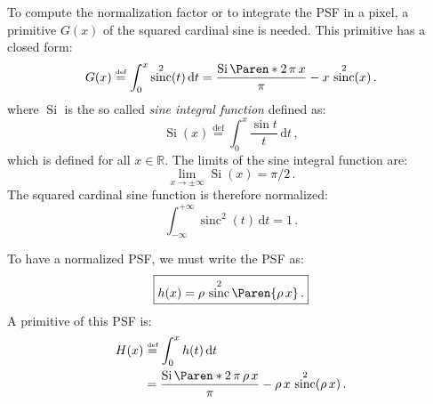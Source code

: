 \documentclass[a4paper,10pt,twocolumn]{scrartcl}
\newcommand*{\mathd}{\mathrm{d}}
\DeclareMathOperator{\sinc}{sinc}
\DeclareMathOperator{\sinint}{Si}
\newcommand*{\Set}[1]{\mathbb{#1}}
\newcommand*{\Reals}{\Set{R}}
\newcommand*{\bydef}{\stackrel{{\scriptscriptstyle \text{def}}}{=}}
\begin{document}
To compute the normalization factor or to integrate the PSF in a pixel, a
primitive $G(x)$ of the squared cardinal sine is needed.  This primitive
has a closed form:
\begin{equation}
   G(x) \bydef \int_0^x \sinc^2(t) \, \mathd t
   = \frac{\sinint\Paren*{2\,\pi\,x}}{\pi} - x\,\sinc^2(x)\, .
\end{equation}
where $\sinint$ is the so called \emph{sine integral function} defined as:
\begin{equation}
  \sinint(x) \bydef \int_0^x \frac{\sin t}{t} \, \mathd t \,,
  \label{eq:sinint}
\end{equation}
which is defined for all $x \in \Reals$.  The limits of the sine integral
function are:
\begin{equation}
  \lim_{x\rightarrow\pm\infty}\sinint(x) = \pi/2 \, .
\end{equation}
The squared cardinal sine function is therefore normalized:
\begin{equation}
  \int_{-\infty}^{+\infty} \sinc^2(t)\,\mathd t = 1 \,.
\end{equation}

To have a normalized PSF, we must write the PSF as:
\begin{equation}
  \boxed{
    h(x) = \rho\,\sinc^2\Paren{\rho\,x} \, .
  }
  \label{eq:slit-psf}
\end{equation}
A primitive of this PSF is:
\begin{align}
   H(x) &\bydef \int_0^x h(t) \, \mathd t \\
   &= \frac{\sinint\Paren*{2\,\pi\,\rho\,x}}{\pi} - \rho\,x\,\sinc^2(\rho\,x)\, .
\end{align}

\footnotesize


\end{document}

